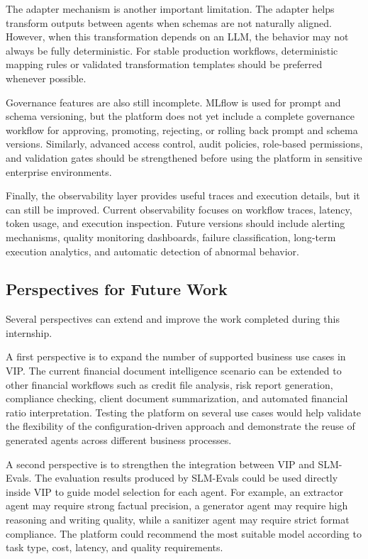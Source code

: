 The adapter mechanism is another important limitation. The adapter helps transform outputs between agents when schemas are not naturally aligned. However, when this transformation depends on an LLM, the behavior may not always be fully deterministic. For stable production workflows, deterministic mapping rules or validated transformation templates should be preferred whenever possible.

Governance features are also still incomplete. MLflow is used for prompt and schema versioning, but the platform does not yet include a complete governance workflow for approving, promoting, rejecting, or rolling back prompt and schema versions. Similarly, advanced access control, audit policies, role-based permissions, and validation gates should be strengthened before using the platform in sensitive enterprise environments.

Finally, the observability layer provides useful traces and execution details, but it can still be improved. Current observability focuses on workflow traces, latency, token usage, and execution inspection. Future versions should include alerting mechanisms, quality monitoring dashboards, failure classification, long-term execution analytics, and automatic detection of abnormal behavior.

\subsection{Perspectives for Future Work}

Several perspectives can extend and improve the work completed during this internship.

A first perspective is to expand the number of supported business use cases in VIP. The current financial document intelligence scenario can be extended to other financial workflows such as credit file analysis, risk report generation, compliance checking, client document summarization, and automated financial ratio interpretation. Testing the platform on several use cases would help validate the flexibility of the configuration-driven approach and demonstrate the reuse of generated agents across different business processes.

A second perspective is to strengthen the integration between VIP and SLM-Evals. The evaluation results produced by SLM-Evals could be used directly inside VIP to guide model selection for each agent. For example, an extractor agent may require strong factual precision, a generator agent may require high reasoning and writing quality, while a sanitizer agent may require strict format compliance. The platform could recommend the most suitable model according to task type, cost, latency, and quality requirements.

